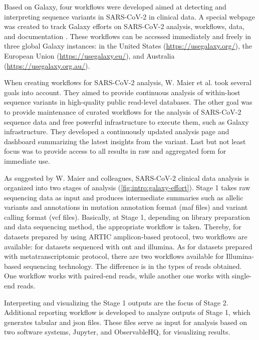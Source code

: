         Based on Galaxy, four workflows were developed aimed at detecting and interpreting sequence variants in SARS-CoV-2 in clinical data. A special webpage was created to track Galaxy efforts on SARS-CoV-2 analysis, workflows, data, and documentation \cite{galaxyproject}. These workflows can be accessed immediately and freely in three global Galaxy instances: in the United States (\url{https://usegalaxy.org/}), the European Union (\url{https://usegalaxy.eu/}), and Australia (\url{https://usegalaxy.org.au/}). 
        
        When creating workflows for SARS-CoV-2 analysis, W. Maier et al. \cite{maier2021b} took several goals into account. They aimed to provide continuous analysis of within-host sequence variants in high-quality public read-level databases. The other goal was to provide maintenance of curated workflows for the analysis of SARS-CoV-2 sequence data and free powerful infrastructure to execute them, such as Galaxy infrastructure. They developed a continuously updated analysis page and dashboard summarizing the latest insights from the variant. Last but not least focus was to provide access to all results in raw and aggregated form for immediate use.
        
        As suggested by W. Maier and colleagues, SARS-CoV-2 clinical data analysis is organized into two stages of analysis (\cref{fig:intro:galaxy-effort}). Stage 1 takes raw sequencing data as input and produces intermediate summaries such as allelic variants and annotations in mutation annotation format (\acrshort{maf} files) and variant calling format (\acrshort{vcf} files). Basically, at Stage 1, depending on library preparation and data sequencing method, the appropriate workflow is taken. Thereby, for datasets prepared by using ARTIC amplicon-based protocol, two workflows are available: for datasets sequenced with \acrfull{ont} and \acrfull{illumina}. As for datasets prepared with metatranscriptomic protocol, there are two workflows available for Illumina-based sequencing technology. The difference is in the types of reads obtained. One workflow works with paired-end reads, while another one works with single-end reads.
        
        Interpreting and visualizing the Stage 1 outputs are the focus of Stage 2. Additional reporting workflow is developed to analyze outputs of Stage 1, which generates tabular and \acrshort{json} files. These files serve as input for analysis based on two software systems, Jupyter, and ObservableHQ, for visualizing results.
        

